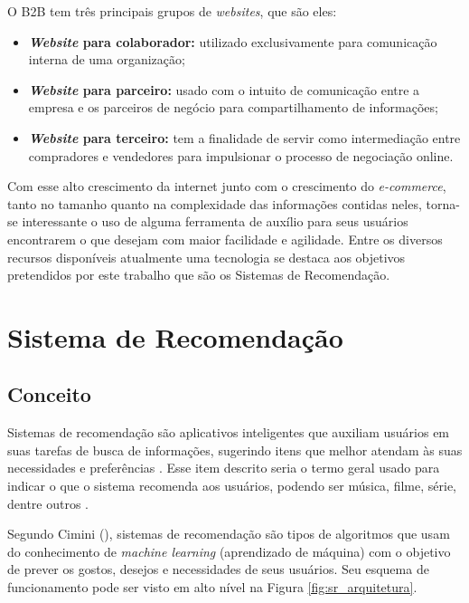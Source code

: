 O B2B tem três principais grupos de \textit{websites}, que são eles:
\begin{itemize}
    \item \textbf{\textit{Website} para colaborador:} utilizado exclusivamente para comunicação interna de uma organização;
    
    \item \textbf{\textit{Website} para parceiro:} usado com o intuito de comunicação entre a empresa e os parceiros de negócio para compartilhamento de informações;
    
    \item \textbf{\textit{Website} para terceiro:} tem a finalidade de servir como intermediação entre compradores e vendedores para impulsionar o processo de negociação online.
    
\end{itemize}

Com esse alto crescimento da internet junto com o crescimento do \textit{e-commerce}, tanto no tamanho quanto na complexidade das informações contidas neles, torna-se interessante o uso de alguma ferramenta de auxílio para seus usuários encontrarem o que desejam com maior facilidade e agilidade. Entre os diversos recursos disponíveis atualmente uma tecnologia se destaca aos objetivos pretendidos por este trabalho que são os Sistemas de Recomendação.

\section{Sistema de Recomendação}
\label{SR}

\subsection{Conceito}

Sistemas de recomendação são aplicativos inteligentes que auxiliam usuários em suas tarefas de busca de informações, sugerindo itens que melhor atendam às suas necessidades e preferências \cite{Mahmood:2009:IRS:1557914.1557930}. Esse item descrito seria o termo geral usado para indicar o que o sistema recomenda aos usuários, podendo ser música, filme, série, dentre outros \cite{Ricci:2010}.

Segundo Cimini (\citeyear{Cimini:2019}), sistemas de recomendação são tipos de algoritmos que usam do conhecimento de \textit{machine learning} (aprendizado de máquina) com o objetivo de prever os gostos, desejos e necessidades de seus usuários. Seu esquema de funcionamento pode ser visto em alto nível na Figura \ref{fig:sr_arquitetura}.

